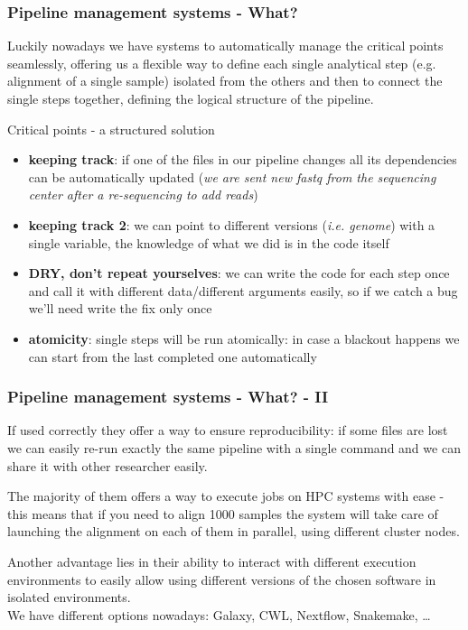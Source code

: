 \documentclass[xcolor=table]{beamer}
\begin{document}
\begin{frame}
\frametitle{Pipeline management systems - What?}
\begin{tiny}
Luckily nowadays we have systems to automatically manage the critical points seamlessly, offering us a flexible way to define each single analytical
step (e.g. alignment of a single sample) isolated from the others and then to connect the single steps together, defining the logical structure of the pipeline.
\end{tiny}
\begin{footnotesize}
\begin{beamerboxesrounded}[upper=upper_box2,lower=lower_box,shadow=true]{Critical points - a structured solution}
\begin{itemize}
\item \textbf{keeping track}: if one of the files in our pipeline changes all its \textcolor{novak}{dependencies} can be automatically updated (\emph{we are sent new fastq from the sequencing center after a re-sequencing to add reads})
\item \textbf{keeping track 2}: we can point to different versions (\emph{i.e. genome}) with a single variable, the \textcolor{novak}{knowledge} of what we did is in the code itself
\item \textbf{DRY, don't repeat yourselves}: we can write the code for each step once and call it with different data/different arguments easily, so if we catch a bug we'll need write the fix only once
\item \textbf{atomicity}: single steps will be run \textcolor{galon}{atomically}: in case a blackout happens we can start from the last completed one automatically
\end{itemize}
\end{beamerboxesrounded}
\end{footnotesize}
\end{frame}

\begin{frame}
\frametitle{Pipeline management systems - What? - II}
If used correctly they offer a way to ensure \textcolor{novak}{reproducibility}: if some files are lost we can easily re-run exactly
the same pipeline with a single command and we can share it with other researcher easily.

The majority of them offers a way to execute jobs on \textcolor{galon}{HPC systems} with ease - this means that if you need
to align 1000 samples the system will take care of launching the alignment on each of them in parallel, using different cluster nodes.

Another advantage lies in their ability to interact with different \textcolor{beer}{execution environments}
to easily allow using different versions of the chosen software in isolated environments.
\\ \vspace{0.5cm}
We have different options nowadays: \textcolor{beer}{Galaxy, CWL,  Nextflow, Snakemake, \ldots}
\end{frame}
\end{document}
